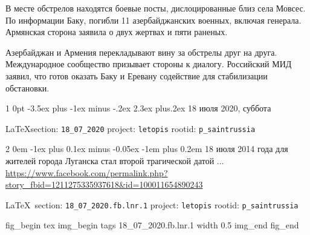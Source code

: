 \documentclass[a4paper,11pt]{extreport}
\makeatletter
\renewcommand\section{%
  \clearpage
  \@startsection{section}%
    {1}%
    {0pt}%
    {-3.5ex plus -1ex minus -.2ex}%
    {2.3ex plus.2ex}%
    {\centering\normalfont\Huge\bfseries}%
}
\renewcommand\subsection{%
  \clearpage
    \@startsection{subsection}%
    {2}%
    {0em}%
    {-1ex plus 0.1ex minus -0.05ex}%
    {-1em plus 0.2em}%
    {\scshape\bfseries\Large}%
}
\makeatother
\begin{document}
В месте обстрелов находятся боевые посты, дислоцированные близ села Мовсес. По
информации Баку, погибли 11 азербайджанских военных, включая генерала.
Армянская сторона заявила о двух жертвах и пяти раненых.

Азербайджан и Армения перекладывают вину за обстрелы друг на друга.
Международное сообщество призывает стороны к диалогу. Российский МИД заявил,
что готов оказать Баку и Еревану содействие для стабилизации обстановки.
  
  
 
 

\section{18 июля 2020, суббота}
\label{sec:18_07_2020}

\vspace{0.5cm}
{\small\LaTeX section: \verb|18_07_2020| project: \verb|letopis| rootid: \verb|p_saintrussia|}
\vspace{0.5cm}

 
 
  
\subsection{18 июля 2014 года для жителей города Луганска стал второй трагической датой ...}
\label{sec:18_07_2020.fb.lnr.1}
\url{https://www.facebook.com/permalink.php?story_fbid=1211275335937618&id=100011654890243}

\vspace{0.5cm}
{\small\LaTeX~section: \verb|18_07_2020.fb.lnr.1| project: \verb|letopis| rootid: \verb|p_saintrussia|}
\vspace{0.5cm}

\ifcmt
fig_begin 
	tex \centering
  img_begin 
    tags 18_07_2020.fb.lnr.1
    width 0.5
  img_end
fig_end
\fi
  
\end{document}
